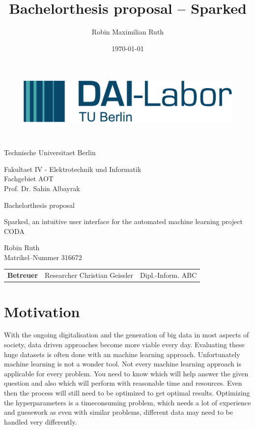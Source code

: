 \documentclass[12pt,a4paper,titlepage,oneside,BCOR1cm]{scrreprt}
\date{\today}
\author{Robin Maximilian Ruth}
\title{Bachelorthesis proposal -- Sparked}
\begin{document}
\thispagestyle{empty}

\begin{figure}[htbp]
\centering
 \begin{minipage}[b]{41 mm}
   \includegraphics[width=40 mm]{./figures/DAI_Logo.png}
 \end{minipage}
\end{figure}

~\vspace{0.5cm}

\begin{center}
\begin{Huge}
Technische Universitaet Berlin\\
\vspace{1mm}
\end{Huge}{\Large Fakultaet IV - Elektrotechnik und Informatik\\
Fachgebiet AOT\\
Prof. Dr. Sahin Albayrak}\\

\vspace{26mm}
\begin{LARGE}
Bachelorthesis proposal\\
\end{LARGE}
\vspace{8mm}
\begin{LARGE}
Sparked, an intuitive user interface for the automated machine learning project CODA\\
\end{LARGE}
\vspace{3 cm}
Robin Ruth\\
Matrikel--Nummer 316672\\
\vspace{1cm}
\begin{tabular}{lll}
    \textbf{Betreuer} & Researcher Christian Geissler & Dipl.-Inform. ABC\\
\end{tabular}

\end{center}

\tableofcontents
\thispagestyle{empty}


\chapter{Motivation}
With the ongoing digitalisation and the generation of big data in most aspects of society, 
data driven approaches become more viable every day. 
Evaluating these huge datasets is often done with an machine learning approach. 
Unfortunately machine learning is not a wonder tool. Not every machine learning approach is applicable 
for every problem. You need to know which will help answer the given question and also which 
will perform with reasonable time and resources.
Even then the process will still need to be optimized to get optimal results. 
Optimizing the hyperparameters is a timeconsuming problem, which needs a lot of experience and guesswork 
as even with similar problems, different data may need to be handled very differently. 
\end{document}
